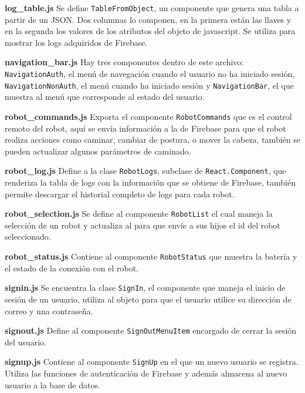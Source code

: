 \textbf{log\_table.js}
\label{\detokenize{code_docs:log-table-js}}
Se define \texttt{TableFromObject}, un componente que genera una tabla a partir de un JSON. Dos columnas lo
componen, en la primera están las llaves y en la segunda los valores de los
atributos del objeto de javascript. Se utiliza para mostrar los logs adquiridos
de Firebase.

\textbf{navigation\_bar.js}
\label{\detokenize{code_docs:navigation-bar-js}}
Hay tres componentes dentro de este archivo:
\texttt{NavigationAuth}, el menú de navegación cuando el
usuario no ha iniciado sesión,
\texttt{NavigationNonAuth}, el menú cuando ha iniciado sesión y
\texttt{NavigationBar}, 
el que muestra al menú que corresponde al estado del usuario.


\textbf{robot\_commands.js}
\label{\detokenize{code_docs:robot-commands-js}}
Exporta el componente \texttt{RobotCommands} que es el control remoto del robot, aquí se envía información a la
de Firebase para que el robot realiza acciones como caminar, cambiar de postura,
o mover la cabeza, también se pueden actualizar algunos parámetros de caminado.

\textbf{robot\_log.js}
\label{\detokenize{code_docs:robot-log-js}}
Define a la clase \texttt{RobotLogs}, subclase de \texttt{React.Component}, que renderiza la tabla de logs con la información que se obtiene de
Firebase, también permite descargar el historial completo de logs para cada
robot.


\textbf{robot\_selection.js}
\label{\detokenize{code_docs:robot-selection-js}}
Se define al componente \texttt{RobotList} el cual maneja la selección de un robot y actualiza al
 para que envíe a sus hijos el id del robot seleccionado.

\textbf{robot\_status.js}
Contiene al componente \texttt{RobotStatus} que muestra la batería y el estado de la conexión con el robot.

\textbf{signin.js}
\label{\detokenize{code_docs:signin-js}}
Se encuentra la clase \texttt{SignIn}, el componente que maneja el inicio de sesión de un usuario, utiliza al
objeto  para que el usuario utilice su dirección de correo y una
contraseña.


\textbf{signout.js}
\label{\detokenize{code_docs:signout-js}}
Define al componente \texttt{SignOutMenuItem} encargado de cerrar la sesión del usuario.


\textbf{signup.js}
\label{\detokenize{code_docs:signup-js}}
Contiene al componente \texttt{SignUp} en el que un nuevo usuario se registra. Utiliza las funciones
de autenticación de Firebase y además almacena al nuevo usuario a la base de
datos.

